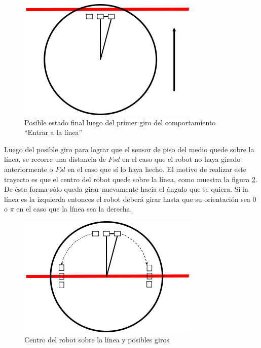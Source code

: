 \begin{figure}[htp]
\begin{center}
\includegraphics[scale=0.4]{comportamientos/figures/floorSensorsLine4.png}
\caption{Posible estado final luego del primer giro del comportamiento
		``Entrar a la l\'inea''}
\label{fig:floorSensorsFinalState}
\end{center}
\end{figure}

Luego del posible giro para lograr que el sensor de piso del medio quede sobre
la l\'inea, se recorre una distancia de $Fsd$ en el caso que el robot no haya
girado anteriormente o $Fsl$ en el caso que s\'i lo haya hecho. El motivo de
realizar este trayecto es que el centro del robot quede sobre la l\'inea, como
muestra la figura \ref{fig:positioned}. De \'esta forma s\'olo queda girar
nuevamente hacia el \'angulo que se quiera. Si la l\'inea es la izquierda
entonces el robot deber\'a girar hasta que su orientaci\'on sea $0$ o $\pi$ en
el caso que la l\'inea sea la derecha.

\begin{figure}[htp]
\begin{center}
\includegraphics[scale=0.4]{comportamientos/figures/floorSensorsLine3.png}
\caption{Centro del robot sobre la l\'inea y posibles giros}
\label{fig:positioned}
\end{center}
\end{figure}

